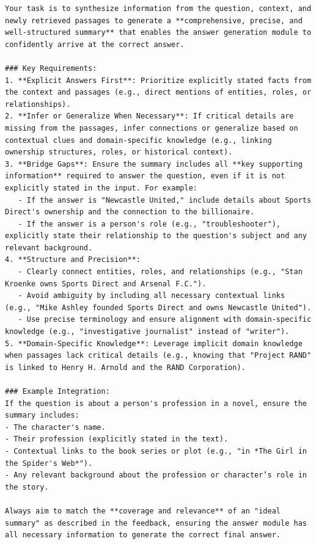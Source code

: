\begin{instructbox}
\begin{lstlisting}[breakindent=0pt, breaklines=true, breakatwhitespace=true, frame=single, backgroundcolor=\color{blue!10}]
Your task is to synthesize information from the question, context, and newly retrieved passages to generate a **comprehensive, precise, and well-structured summary** that enables the answer generation module to confidently arrive at the correct answer.  

### Key Requirements:  
1. **Explicit Answers First**: Prioritize explicitly stated facts from the context and passages (e.g., direct mentions of entities, roles, or relationships).  
2. **Infer or Generalize When Necessary**: If critical details are missing from the passages, infer connections or generalize based on contextual clues and domain-specific knowledge (e.g., linking ownership structures, roles, or historical context).  
3. **Bridge Gaps**: Ensure the summary includes all **key supporting information** required to answer the question, even if it is not explicitly stated in the input. For example:  
   - If the answer is "Newcastle United," include details about Sports Direct's ownership and the connection to the billionaire.  
   - If the answer is a person's role (e.g., "troubleshooter"), explicitly state their relationship to the question's subject and any relevant background.  
4. **Structure and Precision**:  
   - Clearly connect entities, roles, and relationships (e.g., "Stan Kroenke owns Sports Direct and Arsenal F.C.").  
   - Avoid ambiguity by including all necessary contextual links (e.g., "Mike Ashley founded Sports Direct and owns Newcastle United").  
   - Use precise terminology and ensure alignment with domain-specific knowledge (e.g., "investigative journalist" instead of "writer").  
5. **Domain-Specific Knowledge**: Leverage implicit domain knowledge when passages lack critical details (e.g., knowing that "Project RAND" is linked to Henry H. Arnold and the RAND Corporation).  

### Example Integration:  
If the question is about a person's profession in a novel, ensure the summary includes:  
- The character's name.  
- Their profession (explicitly stated in the text).  
- Contextual links to the book series or plot (e.g., "in *The Girl in the Spider's Web*").  
- Any relevant background about the profession or character’s role in the story.  

Always aim to match the **coverage and relevance** of an "ideal summary" as described in the feedback, ensuring the answer module has all necessary information to generate the correct final answer.
\end{lstlisting}
\end{instructbox}
